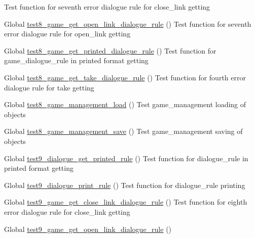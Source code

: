 \begin{DoxyRefList}
%
Test function for seventh error dialogue rule for close\+\_\+link getting  
\item[Global \mbox{\hyperlink{game__test_8c_a907f336254869c6fd00dc6489155d9e5}{test8\+\_\+game\+\_\+get\+\_\+open\+\_\+link\+\_\+dialogue\+\_\+rule}} ()]\label{test__test000374}%
%
Test function for seventh error dialogue rule for open\+\_\+link getting  
\item[Global \mbox{\hyperlink{game__test_8c_aaca53e026d6c53de08044a5e4738fbd0}{test8\+\_\+game\+\_\+get\+\_\+printed\+\_\+dialogue\+\_\+rule}} ()]\label{test__test000318}%
%
Test function for game\+\_\+dialogue\+\_\+rule in printed format getting  
\item[Global \mbox{\hyperlink{game__test_8c_ab0aa3629672af7a9738df61673cb1e3a}{test8\+\_\+game\+\_\+get\+\_\+take\+\_\+dialogue\+\_\+rule}} ()]\label{test__test000342}%
%
Test function for fourth error dialogue rule for take getting  
\item[Global \mbox{\hyperlink{game__management__test_8c_a309a4370b60fcc71c7d885f71d351017}{test8\+\_\+game\+\_\+management\+\_\+load}} ()]\label{test__test000116}%
%
Test game\+\_\+management loading of objects  
\item[Global \mbox{\hyperlink{game__management__test_8c_a80263b1b0d7bb6534b0e5239da5bfe97}{test8\+\_\+game\+\_\+management\+\_\+save}} ()]\label{test__test000130}%
%
Test game\+\_\+management saving of objects  
\item[Global \mbox{\hyperlink{dialogue__test_8c_aee0910deeaee572173420f646c56a292}{test9\+\_\+dialogue\+\_\+get\+\_\+printed\+\_\+rule}} ()]\label{test__test000075}%
%
Test function for dialogue\+\_\+rule in printed format getting  
\item[Global \mbox{\hyperlink{dialogue__test_8c_a3750a89269cc9601330ee081d83e77a4}{test9\+\_\+dialogue\+\_\+print\+\_\+rule}} ()]\label{test__test000065}%
%
Test function for dialogue\+\_\+rule printing  
\item[Global \mbox{\hyperlink{game__test_8c_a66fcecc55032df5f63f9b4e105bd3ae1}{test9\+\_\+game\+\_\+get\+\_\+close\+\_\+link\+\_\+dialogue\+\_\+rule}} ()]\label{test__test000385}%
%
Test function for eighth error dialogue rule for close\+\_\+link getting  
\item[Global \mbox{\hyperlink{game__test_8c_a7ee58f5f36b40895bfef228ccd488f66}{test9\+\_\+game\+\_\+get\+\_\+open\+\_\+link\+\_\+dialogue\+\_\+rule}} ()]\label{test__test000375}%

\end{DoxyRefList}
